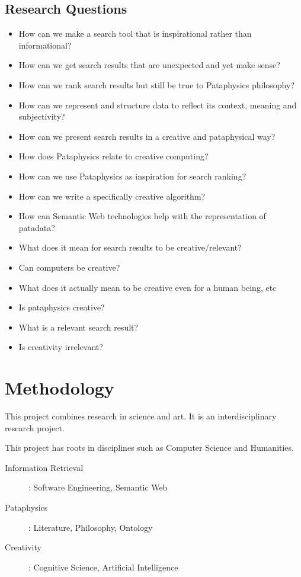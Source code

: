 \subsection{Research Questions}

\begin{itemize}
  \item How can we make a search tool that is inspirational rather than informational?
  \item How can we get search results that are unexpected and yet make sense?
  \item How can we rank search results but still be true to Pataphysics philosophy?
  \item How can we represent and structure data to reflect its context, meaning and subjectivity?
  \item How can we present search results in a creative and pataphysical way?
  \item How does Pataphysics relate to creative computing?
  \item How can we use Pataphysics as inspiration for search ranking?
  \item How can we write a specifically creative algorithm?
  \item How can Semantic Web technologies help with the representation of patadata?
  \item What does it mean for search results to be creative/relevant?
  \item Can computers be creative?
  \item What does it actually mean to be creative even for a human being, etc
  \item Is pataphysics creative?
  \item What is a relevant search result?
  \item Is creativity irrelevant?
\end{itemize}


\section{Methodology}

This project combines research in science and art. It is an interdisciplinary research project.

This project has roots in disciplines such as Computer Science and Humanities.
\begin{description}
  \item [Information Retrieval]: Software Engineering, Semantic Web
  \item [Pataphysics]: Literature, Philosophy, Ontology
  \item [Creativity]: Cognitive Science, Artificial Intelligence
\end{description}

